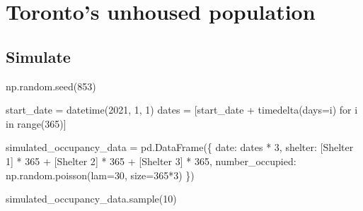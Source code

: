 \documentclass[
  letterpaper,
  DIV=11,
  numbers=noendperiod]{scrreprt}
\newenvironment{Shaded}{\begin{snugshade}}{\end{snugshade}}
\newcommand{\BuiltInTok}[1]{\textcolor[rgb]{0.00,0.23,0.31}{#1}}
\newcommand{\ControlFlowTok}[1]{\textcolor[rgb]{0.00,0.23,0.31}{#1}}
\newcommand{\DecValTok}[1]{\textcolor[rgb]{0.68,0.00,0.00}{#1}}
\newcommand{\KeywordTok}[1]{\textcolor[rgb]{0.00,0.23,0.31}{#1}}
\newcommand{\NormalTok}[1]{\textcolor[rgb]{0.00,0.23,0.31}{#1}}
\newcommand{\OperatorTok}[1]{\textcolor[rgb]{0.37,0.37,0.37}{#1}}
\newcommand{\StringTok}[1]{\textcolor[rgb]{0.13,0.47,0.30}{#1}}
\begin{document}
\hypertarget{torontos-unhoused-population}{%
\section{Toronto's unhoused
population}\label{torontos-unhoused-population}}

\hypertarget{simulate-1}{%
\subsection{Simulate}\label{simulate-1}}

\begin{Shaded}
\begin{Highlighting}[]
\NormalTok{np.random.seed(}\DecValTok{853}\NormalTok{)}

\NormalTok{start\_date }\OperatorTok{=}\NormalTok{ datetime(}\DecValTok{2021}\NormalTok{, }\DecValTok{1}\NormalTok{, }\DecValTok{1}\NormalTok{)}
\NormalTok{dates }\OperatorTok{=}\NormalTok{ [start\_date }\OperatorTok{+}\NormalTok{ timedelta(days}\OperatorTok{=}\NormalTok{i) }\ControlFlowTok{for}\NormalTok{ i }\KeywordTok{in} \BuiltInTok{range}\NormalTok{(}\DecValTok{365}\NormalTok{)]}

\NormalTok{simulated\_occupancy\_data }\OperatorTok{=}\NormalTok{ pd.DataFrame(\{}
    \StringTok{\textquotesingle{}date\textquotesingle{}}\NormalTok{: dates }\OperatorTok{*} \DecValTok{3}\NormalTok{,}
    \StringTok{\textquotesingle{}shelter\textquotesingle{}}\NormalTok{: [}\StringTok{\textquotesingle{}Shelter 1\textquotesingle{}}\NormalTok{] }\OperatorTok{*} \DecValTok{365} \OperatorTok{+}\NormalTok{ [}\StringTok{\textquotesingle{}Shelter 2\textquotesingle{}}\NormalTok{] }\OperatorTok{*} \DecValTok{365} \OperatorTok{+}\NormalTok{ [}\StringTok{\textquotesingle{}Shelter 3\textquotesingle{}}\NormalTok{] }\OperatorTok{*} \DecValTok{365}\NormalTok{,}
    \StringTok{\textquotesingle{}number\_occupied\textquotesingle{}}\NormalTok{: np.random.poisson(lam}\OperatorTok{=}\DecValTok{30}\NormalTok{, size}\OperatorTok{=}\DecValTok{365}\OperatorTok{*}\DecValTok{3}\NormalTok{)}
\NormalTok{\})}

\NormalTok{simulated\_occupancy\_data.sample(}\DecValTok{10}\NormalTok{)}
\end{Highlighting}
\end{Shaded}
\end{document}
